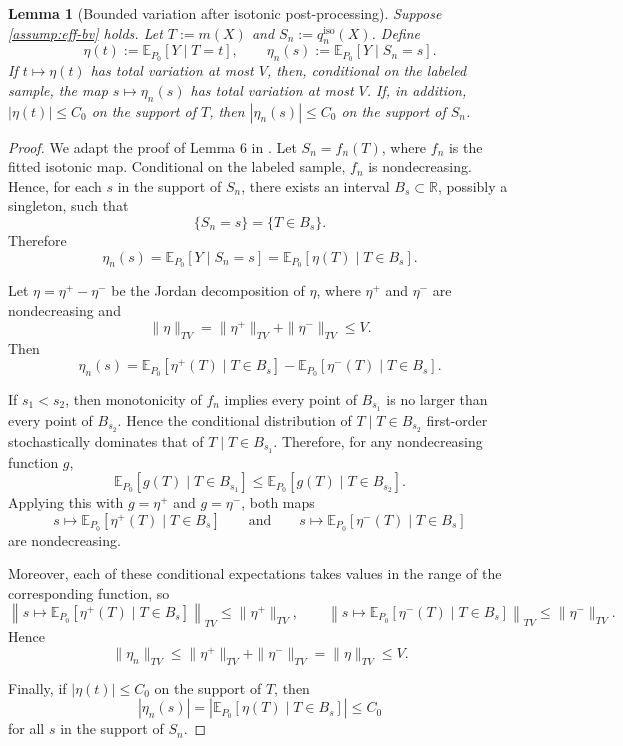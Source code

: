 \documentclass{article}
\theoremstyle{plain}
\newtheorem{lemma}{Lemma}
\theoremstyle{definition}
\newcommand{\E}{\mathbb{E}}
\newcommand{\1}{\mathbf{1}}
\newcommand{\mhat}{m}
\begin{document}
\begin{lemma}[Bounded variation after isotonic post-processing]
\label{lem:bv-post}
Suppose \cref{assump:eff-bv} holds. Let \(T:=\mhat(X)\) and \(S_n:=q_n^{\mathrm{iso}}(X)\). Define
\[
\eta(t):=\E_{P_0}[Y\mid T=t],
\qquad
\eta_n(s):=\E_{P_0}[Y\mid S_n=s].
\]
If \(t\mapsto \eta(t)\) has total variation at most \(V\), then, conditional on the labeled sample, the map \(s\mapsto \eta_n(s)\) has total variation at most \(V\). If, in addition, \(|\eta(t)|\le C_0\) on the support of \(T\), then \(|\eta_n(s)|\le C_0\) on the support of \(S_n\).
\end{lemma}
\begin{proof}
We adapt the proof of Lemma 6 in \cite{van2023causal}. Let \(S_n=f_n(T)\), where \(f_n\) is the fitted isotonic map. Conditional on the labeled sample, \(f_n\) is nondecreasing. Hence, for each \(s\) in the support of \(S_n\), there exists an interval \(B_s\subset \mathbb R\), possibly a singleton, such that
\[
\{S_n=s\}=\{T\in B_s\}.
\]
Therefore
\[
\eta_n(s)
=
\E_{P_0}[Y\mid S_n=s]
=
\E_{P_0}[\eta(T)\mid T\in B_s].
\]

Let \(\eta=\eta^+-\eta^-\) be the Jordan decomposition of \(\eta\), where \(\eta^+\) and \(\eta^-\) are nondecreasing and
\[
\|\eta\|_{TV}=\|\eta^+\|_{TV}+\|\eta^-\|_{TV}\le V.
\]
Then
\[
\eta_n(s)
=
\E_{P_0}[\eta^+(T)\mid T\in B_s]
-
\E_{P_0}[\eta^-(T)\mid T\in B_s].
\]

If \(s_1<s_2\), then monotonicity of \(f_n\) implies every point of \(B_{s_1}\) is no larger than every point of \(B_{s_2}\). Hence the conditional distribution of \(T\mid T\in B_{s_2}\) first-order stochastically dominates that of \(T\mid T\in B_{s_1}\). Therefore, for any nondecreasing function \(g\),
\[
\E_{P_0}[g(T)\mid T\in B_{s_1}]
\le
\E_{P_0}[g(T)\mid T\in B_{s_2}].
\]
Applying this with \(g=\eta^+\) and \(g=\eta^-\), both maps
\[
s\mapsto \E_{P_0}[\eta^+(T)\mid T\in B_s]
\qquad\text{and}\qquad
s\mapsto \E_{P_0}[\eta^-(T)\mid T\in B_s]
\]
are nondecreasing.

Moreover, each of these conditional expectations takes values in the range of the corresponding function, so
\[
\left\|s\mapsto \E_{P_0}[\eta^+(T)\mid T\in B_s]\right\|_{TV}
\le
\|\eta^+\|_{TV},
\qquad
\left\|s\mapsto \E_{P_0}[\eta^-(T)\mid T\in B_s]\right\|_{TV}
\le
\|\eta^-\|_{TV}.
\]
Hence
\[
\|\eta_n\|_{TV}
\le
\|\eta^+\|_{TV}+\|\eta^-\|_{TV}
=
\|\eta\|_{TV}
\le V.
\]

Finally, if \(|\eta(t)|\le C_0\) on the support of \(T\), then
\[
|\eta_n(s)|
=
\left|\E_{P_0}[\eta(T)\mid T\in B_s]\right|
\le C_0
\]
for all \(s\) in the support of \(S_n\).
\end{proof}
\end{document}
